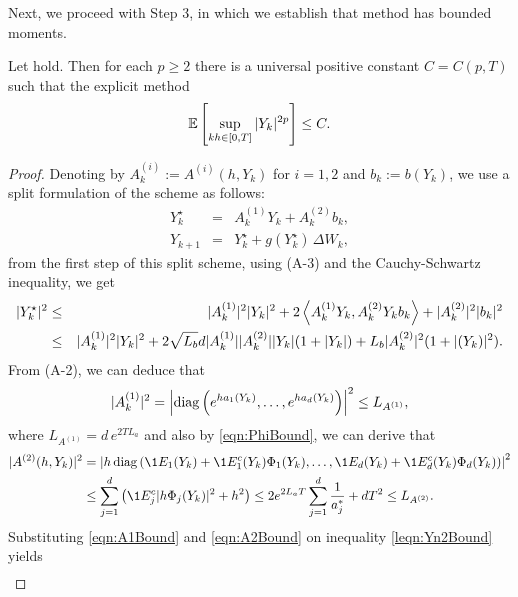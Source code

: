 	Next, we proceed with Step 3, in which we establish that \SM method has bounded moments.
\begin{lem}\label{lem:SSSMMomentBounds}
	Let  hold. Then for each $p\geq 2$ there is 
	a universal positive constant  $C=C(p,T)$ 
	such that the explicit \SM method
	\begin{equation*}
		\mathbb{E}\left[
		\sup_{kh \in [0,T]}
		|Y_k|^{2p}
		\right]\leq C.
	\end{equation*}
\end{lem}
\begin{proof}
Denoting by  $A^{(i)}_k:= A^{(i)} (h,Y_k)$ for $i=1,2$ and $b_k:=b(Y_k)$, we use
a split formulation of the \SM scheme  as follows:
\begin{eqnarray*}
	Y_{k}^{{\star}} &=& A^{(1)}_k Y_k + A^{(2)}_k b_k, \label{split1}\\
	Y_{k+1}&=& Y_k^{{\star}} + g(Y_k^{\star})\, \Delta W_k 
	\label{split2},
\end{eqnarray*}
from the first step of this split scheme, using (A-3) and 
the Cauchy-Schwartz inequality, we get
\begin{eqnarray}
|Y_k^{\star}|^{2}
&\leq&
|A^{(1)}_k |^2 |Y_k|^2  
+ 2 \left\langle A^{(1)}_k Y_k, A^{(2)}_k Y_k 
	b_k\right\rangle
+|A^{(2)}_k|^2 |b_k|^2\nonumber\\
&\leq&
|A^{(1)}_k|^2 |Y_k|^2  
+ 2 \sqrt{L_b} d|A^{(1)}_k||A^{(2)}_k||Y_k|(1+|Y_k|)
+L_b|A^{(2)}_k|^2 (1+|(Y_k)|^2).\label{leqn:Yn2Bound} 
\end{eqnarray}
From (A-2), we can deduce that
\begin{dmath}[label=eqn:A1Bound]
	|A^{(1)}_k|^2 
	=
	\left|
	\diag
	\left(
	e^{ha_1(Y_k)}, \dots, e^{ha_d(Y_k)} 
	\right)
	\right|^2
	\leq L_{A^{(1)}},		
\end{dmath}
where $L_{A^{(1)}}=d\, e^{ 2 T L_a}$ and also by \eqref{eqn:PhiBound}, we can derive that
\begin{align}
	|A^{(2)}(h,Y_k)|^2 
	&=
	\left|
	h 
	\diag
	\left(
	\1{E_1}(Y_k)
	+\1{E_1^c}(Y_k)\Phi_1(Y_k), 
	\dots,
	\1{E_d}(Y_k)
	+\1{E_d^c}(Y_k) \Phi_d(Y_k)
	\right)
	\right|^2 \notag \\
	&\leq
	\sum_{j=1}^{d}
	\left(
	\1{E_j^c}
	|h\Phi_j(Y_k)|^2
	+ h^2
	\right)
	\leq
	2 e^{2 L_a  T}
	\sum_{j=1}^d
	\frac{1}{a_j^*} + d T^2\leq L_{A^{(2)}}.
	\label{eqn:A2Bound}
\end{align}
Substituting \eqref{eqn:A1Bound} and \eqref{eqn:A2Bound}  on  inequality \eqref{leqn:Yn2Bound} yields
\begin{eqnarray*}\label{eqn:YkStarBound}

\end{eqnarray*}
\end{proof}
